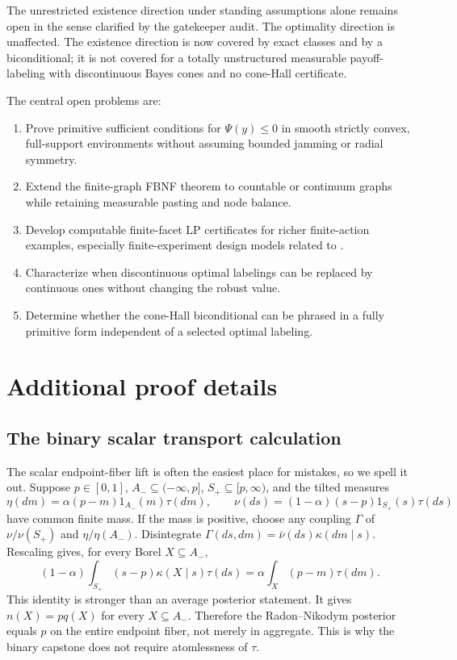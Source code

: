 \documentclass[11pt]{article}
\theoremstyle{definition}
\theoremstyle{remark}
\begin{document}
The unrestricted existence direction under standing assumptions alone remains open in the sense clarified by the gatekeeper audit. The optimality direction is unaffected. The existence direction is now covered by exact classes and by a biconditional; it is not covered for a totally unstructured measurable payoff-labeling with discontinuous Bayes cones and no cone-Hall certificate.

The central open problems are:
\begin{enumerate}[leftmargin=*]
  \item Prove primitive sufficient conditions for $\Psi(y)\le0$ in smooth strictly convex, full-support environments without assuming bounded jamming or radial symmetry.
  \item Extend the finite-graph FBNF theorem to countable or continuum graphs while retaining measurable pasting and node balance.
  \item Develop computable finite-facet LP certificates for richer finite-action examples, especially finite-experiment design models related to \cite{DovalSmolin2024}.
  \item Characterize when discontinuous optimal labelings can be replaced by continuous ones without changing the robust value.
  \item Determine whether the cone-Hall biconditional can be phrased in a fully primitive form independent of a selected optimal labeling.
\end{enumerate}

\appendix

\section{Additional proof details}\label{app:details}

\subsection{The binary scalar transport calculation}

The scalar endpoint-fiber lift is often the easiest place for mistakes, so we spell it out. Suppose $p\in[0,1]$, $A_-\subseteq(-\infty,p]$, $S_+\subseteq[p,\infty)$, and the tilted measures
\[
  \eta(dm)=\alpha(p-m)1_{A_-}(m)\tau(dm),
  \qquad
  \nu(ds)=(1-\alpha)(s-p)1_{S_+}(s)\tau(ds)
\]
have common finite mass. If the mass is positive, choose any coupling $\Gamma$ of $\nu/\nu(S_+)$ and $\eta/\eta(A_-)$. Disintegrate $\Gamma(ds,dm)=\bar\nu(ds)\kappa(dm\mid s)$. Rescaling gives, for every Borel $X\subseteq A_-$,
\[
  (1-\alpha)\int_{S_+}(s-p)\kappa(X\mid s)\tau(ds)
  =\alpha\int_X(p-m)\tau(dm).
\]
This identity is stronger than an average posterior statement. It gives $n(X)=p q(X)$ for every $X\subseteq A_-$. Therefore the Radon--Nikodym posterior equals $p$ on the entire endpoint fiber, not merely in aggregate. This is why the binary capstone does not require atomlessness of $\tau$.
\end{document}
